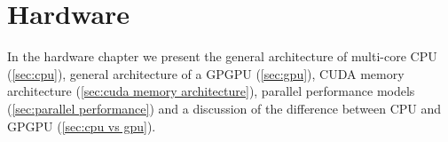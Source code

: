 \chapter{Hardware}
\label{chap:hardware}

In the hardware chapter we present the general architecture of multi-core CPU (\cref{sec:cpu}), general architecture of a GPGPU (\cref{sec:gpu}), CUDA memory architecture (\cref{sec:cuda memory architecture}), parallel performance models (\cref{sec:parallel performance}) and a discussion of the difference between CPU and GPGPU (\cref{sec:cpu vs gpu}).






